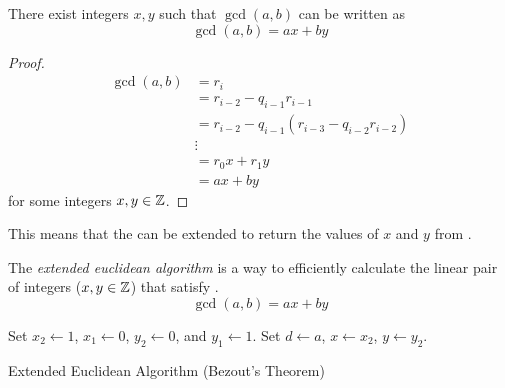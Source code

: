 \begin{theorem}
  There exist integers $x, y$ such that $\gcd(a, b)$ can be written as
  \begin{equation}\label{eq:Extended_Euclidean_Algorithm_Basis}
    \gcd(a, b) = ax + by
  \end{equation}
\end{theorem}
\begin{proof}
  \begin{align*}
    \gcd(a, b) &= r_{i} \\
               &= r_{i-2} - q_{i-1}r_{i-1} \\
               &= r_{i-2} - q_{i-1}(r_{i-3} - q_{i-2}r_{i-2}) \\
               &\vdots \\
               &= r_{0}x + r_{1}y \\
               &= ax + by
  \end{align*}
  for some integers $x, y \in \operatorname{\mathbb{Z}}$.
\end{proof}

This means that the  can be extended to return the values of $x$ and $y$ from .

\begin{definition}\label{def:Extended_Euclidean_Algorithm}
  The \emph{extended euclidean algorithm} is a way to efficiently calculate the linear pair of integers ($x, y \in \operatorname{\mathbb{Z}}$) that satisfy .
  \begin{equation*}
    \gcd(a, b) = ax + by
  \end{equation*}

  \begin{algorithm}[H]
    \DontPrintSemicolon{}

    \BlankLine{}

    Set $x_{2} \leftarrow 1$, $x_{1} \leftarrow 0$, $y_{2} \leftarrow 0$, and $y_{1} \leftarrow 1$. \;
    Set $d \leftarrow a$, $x \leftarrow x_{2}$, $y \leftarrow y_{2}$. \;
    \caption{Extended Euclidean Algorithm (Bezout's Theorem)}
    \label{algo:Extended_Euclidean_Algorithm}
  \end{algorithm}
\end{definition}

